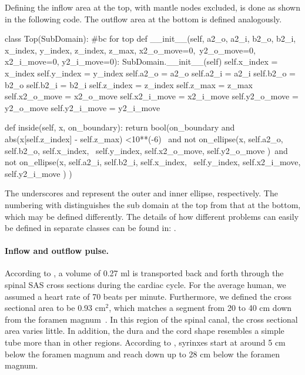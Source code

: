 Defining the inflow area at the top, with mantle nodes excluded, is done as shown in the following code. The outflow area at the bottom is defined analogously.

\begin{python}
class Top(SubDomain):	#bc for top
	def __init__(self, a2_o, a2_i, b2_o, b2_i,  x_index, y_index, z_index, z_max, x2_o_move=0,\
				 y2_o_move=0, x2_i_move=0, y2_i_move=0):
		SubDomain.__init__(self)
		self.x_index = x_index
		self.y_index = y_index
		self.a2_o = a2_o
		self.a2_i = a2_i
		self.b2_o = b2_o
		self.b2_i = b2_i
		self.z_index = z_index
		self.z_max = z_max
		self.x2_o_move = x2_o_move
		self.x2_i_move = x2_i_move
		self.y2_o_move = y2_o_move
		self.y2_i_move = y2_i_move

	def inside(self, x, on_boundary):
		return bool(on_boundary and abs(x[self.z_index] - self.z_max) <10**(-6) \
                       and not on_ellipse(x, self.a2_o, self.b2_o, self.x_index,  \
                           self.y_index, self.x2_o_move, self.y2_o_move )\
                       and not on_ellipse(x, self.a2_i, self.b2_i, self.x_index, \
                           self.y_index, self.x2_i_move, self.y2_i_move ) )
\end{python}

The underscores \emp{o} and \emp{i} represent the outer and inner
ellipse, respectively. The numbering with \emp{2} distinguishes the sub
domain at the top from that at the bottom, which may be defined
differently. The details of how different problems can easily be
defined in separate classes can be found in:
\emp{src/mesh\_definitions/}. %

\paragraph{Inflow and outflow pulse.} According to \cite{GuptaSoellingerBoesigerEtAl2009}, a volume of 0.27 ml is transported back and forth through the spinal SAS cross sections during the cardiac cycle. For the average human, we assumed a heart rate of 70 beats per minute. Furthermore, we defined the cross sectional area to be 0.93 $\mathrm{cm^2}$, which matches a segment from 20 to 40 cm down from the foramen magnum~\cite{Lopes2007}. In this region of the spinal canal, the cross sectional area varies little. In addition, the dura and the cord shape resembles a simple tube more than in other regions. According to \cite{OldfieldMuraszkoShawkerEtAl1994}, syrinxes start at around 5 cm below the foramen magnum and reach down up to 28 cm below the foramen magnum.

